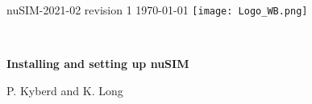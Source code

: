 \graphicspath{ {00-Top-matter/Figures/} }
\thispagestyle{empty}

\noindent nuSIM-2021-02 revision 1 \hfill \today{} \hfill  \texttt{[image: Logo\_WB.png]}

\vspace{-0.25cm}
\noindent{\color{DarkYellow} \rule[0mm]{\textwidth}{0.43pt}}\\
\vspace{-0.50cm}
\begin{center}
  {\bf\LARGE\color{DarkBlue}
    Installing and setting up nuSIM
  }
\end{center}
\vspace{-0.4cm}
\begin{center}
  P. Kyberd and K. Long
\end{center}
\vspace{-0.2cm}
